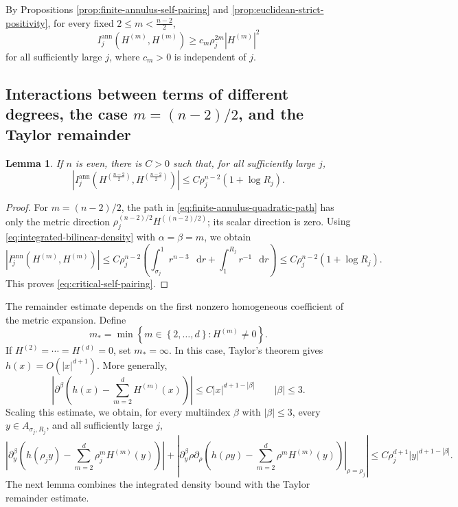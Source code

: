 \documentclass[11pt]{article}
\numberwithin{equation}{section}
\newtheorem{lemma}[theorem]{Lemma}
\theoremstyle{remark}
\newcommand{\dd}{\mathop{}\!\mathrm{d}}
\begin{document}
By Propositions  \ref{prop:finite-annulus-self-pairing} and
\ref{prop:euclidean-strict-positivity}, for every fixed \(2\le m<\frac{n-2}{2}\),
\begin{equation}\label{eq:finite-annulus-positive-term}
 I_j^{\mathrm{ann}}(H^{(m)},H^{(m)})
 \ge c_m\rho_j^{2m}|H^{(m)}|^2
\end{equation}
{for all sufficiently large \(j\), where \(c_m>0\) is independent
of \(j\).}


\subsection{\texorpdfstring{Interactions between terms of different degrees, the case \(m=(n-2)/2\), and the Taylor remainder}{Interactions between terms of different degrees, the case m=(n-2)/2, and the Taylor remainder}}

\begin{lemma}\label{lem:critical-self-pairing}
If \(n\) is even, there is \(C>0\) such that, for all sufficiently large
\(j\),
\begin{equation}\label{eq:critical-self-pairing}
 |I_j^{\mathrm{ann}}(H^{(\frac{n-2}{2})},H^{(\frac{n-2}{2})})|
 \le C\rho_j^{n-2}(1+\log R_j).
\end{equation}
\end{lemma}

\begin{proof}
For \(m=(n-2)/2\), the path in
\eqref{eq:finite-annulus-quadratic-path} has only the metric direction
\(\rho_j^{(n-2)/2}H^{((n-2)/2)}\); its scalar direction is zero.
{Using \eqref{eq:integrated-bilinear-density} with
\(\alpha=\beta=m\), we obtain}
 {
\[
 |I_j^{\mathrm{ann}}(H^{(m)},H^{(m)})|
 \le C\rho_j^{n-2}
 \left(\int_{\sigma_j}^1r^{n-3}\,\dd r
 +\int_1^{R_j}r^{-1}\,\dd r\right)
 \le C\rho_j^{n-2}(1+\log R_j).
\]
}
This proves \eqref{eq:critical-self-pairing}.
\end{proof}

The remainder estimate depends on the first nonzero homogeneous coefficient
of the metric expansion. Define
\begin{equation}\label{eq:first-nonzero-degree}
 m_*=\min\left\{
 m\in\left\{2,\ldots,d\right\}:
 H^{(m)}\ne0\right\}.
\end{equation}
If \(H^{(2)}=\cdots=H^{(d)}=0\), set \(m_*=\infty\). In this case,
Taylor's theorem gives \(h(x)=O(|x|^{d+1})\). More generally,
\[
 \left|
 \partial^\beta\left(
 h(x)-\sum_{m=2}^{d}H^{(m)}(x)
 \right)\right|
 \le C|x|^{d+1-|\beta|}
 \qquad |\beta|\le3.
\]
{Scaling this estimate, we obtain, for every
multiindex \(\beta\) with \(|\beta|\le3\), every
\(y\in A_{\sigma_j,R_j}\), and all sufficiently large \(j\),}
\begin{equation}\label{eq:scaled-metric-taylor-remainder}
\left|\partial_y^\beta\left(
 h(\rho_jy)
 -\sum_{m=2}^{d}
 \rho_j^mH^{(m)}(y)\right)\right|+\left|\partial_y^\beta
 \left.\rho\partial_\rho\left(
 h(\rho y)
 -\sum_{m=2}^{d}
 \rho^mH^{(m)}(y)\right)\right|_{\rho=\rho_j}\right|\le
 C\rho_j^{d+1}
 |y|^{d+1-|\beta|}.
\end{equation}
The next lemma combines the integrated density bound with the Taylor
remainder estimate.
\end{document}

